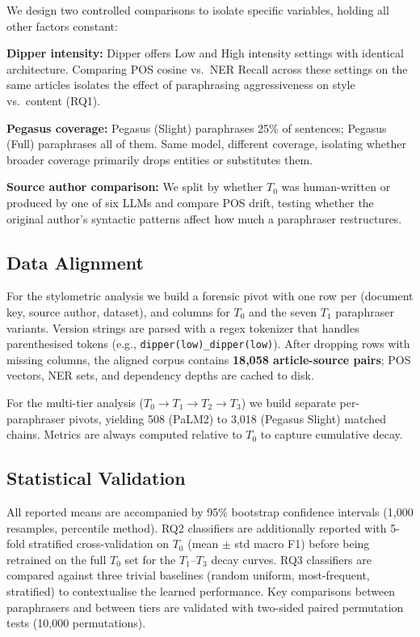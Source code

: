 We design two controlled comparisons to isolate specific variables, holding all other factors constant:

\textbf{Dipper intensity:} Dipper \cite{krishna2023dipper} offers Low and High intensity settings with identical architecture. Comparing POS cosine vs.\ NER Recall across these settings on the same articles isolates the effect of paraphrasing aggressiveness on style vs.\ content (RQ1).

\textbf{Pegasus coverage:} Pegasus (Slight) \cite{zhang2020pegasus} paraphrases 25\% of sentences; Pegasus (Full) paraphrases all of them. Same model, different coverage, isolating whether broader coverage primarily drops entities or substitutes them.

\textbf{Source author comparison:} We split by whether $T_0$ was human-written or produced by one of six LLMs and compare POS drift, testing whether the original author's syntactic patterns affect how much a paraphraser restructures.

\subsection{Data Alignment}

For the stylometric analysis we build a forensic pivot with one row per (document key, source author, dataset), and columns for $T_0$ and the seven $T_1$ paraphraser variants. Version strings are parsed with a regex tokenizer that handles parenthesised tokens (e.g., \texttt{dipper(low)\_dipper(low)}). After dropping rows with missing columns, the aligned corpus contains \textbf{18,058 article-source pairs}; POS vectors, NER sets, and dependency depths are cached to disk.

For the multi-tier analysis ($T_0 \rightarrow T_1 \rightarrow T_2 \rightarrow T_3$) we build separate per-paraphraser pivots, yielding 508 (PaLM2) to 3,018 (Pegasus Slight) matched chains. Metrics are always computed relative to $T_0$ to capture cumulative decay.

\subsection{Statistical Validation}

All reported means are accompanied by 95\% bootstrap confidence intervals (1,000 resamples, percentile method). RQ2 classifiers are additionally reported with 5-fold stratified cross-validation on $T_0$ (mean $\pm$ std macro F1) before being retrained on the full $T_0$ set for the $T_1$--$T_3$ decay curves. RQ3 classifiers are compared against three trivial baselines (random uniform, most-frequent, stratified) to contextualise the learned performance. Key comparisons between paraphrasers and between tiers are validated with two-sided paired permutation tests (10,000 permutations).
